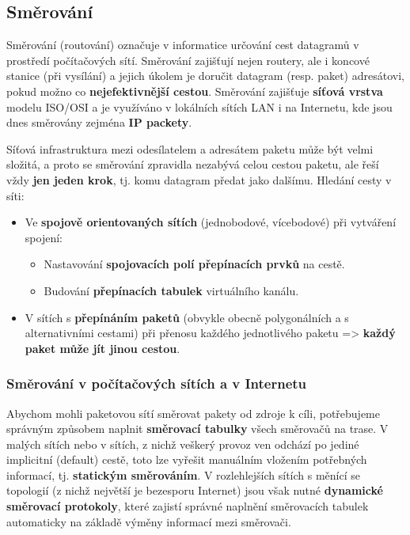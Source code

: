 \subsection{Směrování} 
Směrování (routování) označuje v informatice určování cest datagramů v prostředí počítačových sítí. Směrování zajišťují nejen routery, ale i koncové stanice (při vysílání) a jejich úkolem je doručit datagram (resp. paket) adresátovi, pokud možno co \textbf{nejefektivnější cestou}. Směrování zajišťuje \textbf{síťová vrstva} modelu ISO/OSI a je využíváno v lokálních sítích LAN i na Internetu, kde jsou dnes směrovány zejména \textbf{IP packety}.

Síťová infrastruktura mezi odesílatelem a adresátem paketu může být velmi složitá, a proto se směrování zpravidla nezabývá celou cestou paketu, ale řeší vždy \textbf{jen jeden krok}, tj. komu datagram předat jako dalšímu. Hledání cesty v síti:

\begin{itemize}
	\item Ve \textbf{spojově orientovaných sítích} (jednobodové, vícebodové) při vytváření spojení:
	\begin{itemize}
		\item Nastavování \textbf{spojovacích polí přepínacích prvků} na cestě.
		\item Budování \textbf{přepínacích tabulek} virtuálního kanálu.
	\end{itemize}
	\item V sítích s \textbf{přepínáním paketů} (obvykle obecně polygonálních a s alternativními cestami) při přenosu každého jednotlivého paketu => \textbf{každý paket může jít jinou cestou}.
\end{itemize}

\subsubsection{Směrování v počítačových sítích a v Internetu}
Abychom mohli paketovou sítí směrovat pakety od zdroje k cíli, potřebujeme správným způsobem naplnit \textbf{směrovací tabulky} všech směrovačů na trase. V malých sítích nebo v sítích, z nichž veškerý provoz ven odchází po jediné implicitní (default) cestě, toto lze vyřešit manuálním vložením potřebných informací, tj. \textbf{statickým směrováním}. V rozlehlejších sítích s měnící se topologií (z nichž největší je bezesporu Internet) jsou však nutné \textbf{dynamické směrovací protokoly}, které zajistí správné naplnění směrovacích tabulek automaticky na základě výměny informací mezi směrovači.

